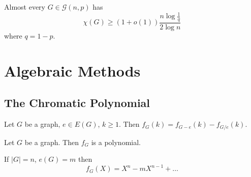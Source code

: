 \documentclass{article}
\begin{document}
\begin{ncor}\label{cor:42}
    Almost every $G \in \mathcal{G}(n,p)$ has
    \begin{equation*}
        \chi(G) \geq (1 + o(1))\frac{n \log \frac{1}{q}}{2 \log n}
    \end{equation*}
    where $q = 1-p.$
\end{ncor}




\clearpage
\section{Algebraic Methods}



























\subsection{The Chromatic Polynomial}










\begin{nthm}\label{thm:43}
    Let $G$ be a graph, $e \in E(G)$, $k \geq 1$. Then $f_G(k) = f_{G-e}(k) - f_{G/e} (k)$.
\end{nthm}

\begin{ncor}\label{cor:44}
    Let $G$ be a graph. Then $f_G$ is a polynomial.
\end{ncor}














\begin{ncor}\label{cor:45}
    If $|G| = n$, $e(G) = m$ then
    \begin{equation*}
        f_G(X) = X^n - m X^{n-1} + \dotsc
    \end{equation*}
\end{ncor}
\end{document}
